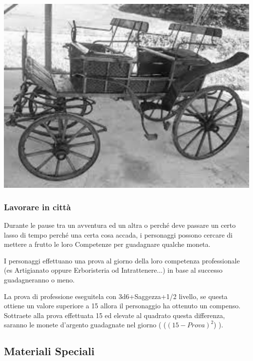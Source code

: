 \begin{multicols}{2}


\begin{center}
\includegraphics[width=0.8\linewidth]{immagini/carrozza.png}
\end{center}




\subsubsection{Lavorare in città}

Durante le pause tra un avventura ed un altra o perché deve passare un certo lasso di tempo perché una certa cosa accada, i personaggi possono cercare di mettere a frutto le loro Competenze per guadagnare qualche moneta.

I personaggi effettuano una prova al giorno della loro competenza professionale (es Artigianato oppure Erboristeria od Intrattenere...) in base al successo guadagneranno o meno.

La prova di professione eseguitela con 3d6+Saggezza+1/2 livello, se questa ottiene un valore superiore a 15 allora il personaggio ha ottenuto un compenso. Sottraete alla prova effettuata 15 ed elevate al quadrato questa differenza, saranno le monete d'argento guadagnate nel giorno ( ($(15-Prova)^2$) ).

\end{multicols}


\pagebreak

\subsection{Materiali Speciali}

